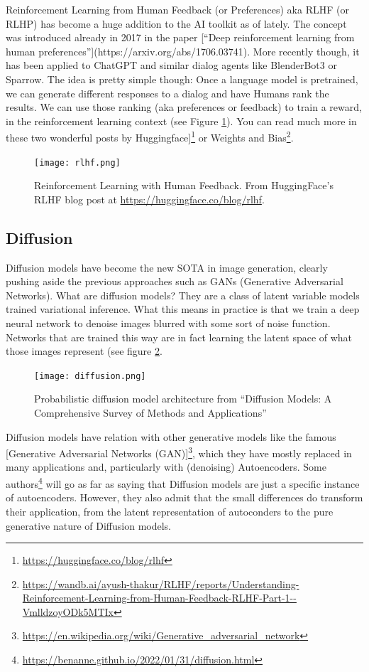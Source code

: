 \documentclass{article}
\begin{document}
Reinforcement Learning from Human Feedback (or Preferences) aka RLHF (or RLHP) has become a huge addition to the AI toolkit as of lately. The concept was introduced already in 2017 in the paper [“Deep reinforcement learning from human preferences”](https://arxiv.org/abs/1706.03741). More recently though, it has been applied to ChatGPT and similar dialog agents like BlenderBot3 or Sparrow. The idea is pretty simple though: Once a language model is pretrained, we can generate different responses to a dialog and have Humans rank the results. We can use those ranking (aka preferences or feedback) to train a reward, in the reinforcement learning context (see Figure \ref{fig:rlhf}). You can read much more in these two wonderful posts by Huggingface]\footnote{\url{https://huggingface.co/blog/rlhf}} or Weights and Bias\footnote{\url{https://wandb.ai/ayush-thakur/RLHF/reports/Understanding-Reinforcement-Learning-from-Human-Feedback-RLHF-Part-1--VmlldzoyODk5MTIx}}.

\begin{figure}
    \centering
    \texttt{[image: rlhf.png]}
    \caption{Reinforcement Learning with Human Feedback. From HuggingFace’s RLHF blog post at \url{https://huggingface.co/blog/rlhf}. }
    \label{fig:rlhf}
\end{figure}



\subsection{Diffusion}

Diffusion models have become the new SOTA in image generation, clearly pushing aside the previous approaches such as GANs (Generative Adversarial Networks). What are diffusion models? They are a class of latent variable models trained variational inference. What this means in practice is that we train a deep neural network to denoise images blurred with some sort of noise function. Networks that are trained this way are in fact learning the latent space of what those images represent (see figure \ref{fig:diffusion}.

\begin{figure}
    \centering
    \texttt{[image: diffusion.png]}
    \caption{Probabilistic diffusion model architecture from “Diffusion Models: A Comprehensive Survey of Methods and Applications” \cite{yang2022diffusion} }
    \label{fig:diffusion}
\end{figure}


Diffusion models have relation with other generative models like the famous [Generative Adversarial Networks (GAN)]\footnote{\url{https://en.wikipedia.org/wiki/Generative_adversarial_network}}, which they have mostly replaced in many applications and, particularly with (denoising) Autoencoders. Some authors\footnote{\url{https://benanne.github.io/2022/01/31/diffusion.html}} will go as far as saying that Diffusion models are just a specific instance of autoencoders. However, they also admit that the small differences do transform their application, from the latent representation of autoconders to the pure generative nature of Diffusion models.
\end{document}
